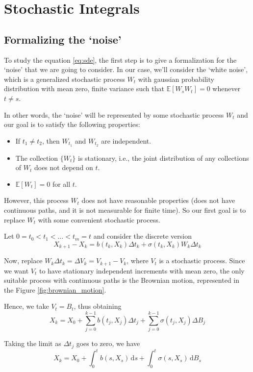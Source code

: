 \documentclass[12pt,a4paper]{article}
\theoremstyle{definition}
\begin{document}
\newpage
\section{Stochastic Integrals}

\subsection{Formalizing the `noise'}

To study the equation \eqref{eq:sde}, the first step is to give a formalization for the `noise' that we are going to consider. In our case, we'll consider the `white noise', which is a generalized stochastic process $W_t$ with gaussian probability distribution with mean zero, finite variance such that $\mathbb{E}[W_sW_t]=0$ whenever $t\neq s$.

In other words, the `noise' will be represented by some stochastic process $W_t$ and our goal is to satisfy the following properties:
\begin{itemize}
	\item If $t_1 \neq t_2$, then $W_{t_1}$ and $W_{t_2}$ are independent.
	\item The collection $\{W_t\}$ is stationary, i.e., the joint distribution of any collections of $W_t$ does not depend on $t$.
	\item $\mathbb{E}[W_t] = 0$ for all $t$.
\end{itemize}

However, this process $W_t$ does not have reasonable properties (does not have continuous paths, and it is not measurable for finite time). So our first goal is to replace $W_t$ with some convenient stochastic process.

Let $0 = t_0 < t_1 < \ldots < t_m = t$ and consider the discrete version
\[
	X_{k+1} - X_k = b(t_k,X_k)\Delta t_k + \sigma(t_k,X_k)W_k \Delta t_k
\]

Now, replace $W_k \Delta t_k = \Delta V_k = V_{k+1} - V_k$, where $V_t$ is a stochastic process. Since we want $V_t$ to have stationary independent increments with mean zero, the only suitable process with continuous paths is the Brownian motion, represented in the Figure \ref{fig:brownian_motion}.

Hence, we take $V_t = B_t$, thus obtaining
\[
	X_k = X_0 + \sum_{j=0}^{k-1} b(t_j, X_j) \Delta t_j + \sum_{j=0}^{k-1} \sigma(t_j, X_j) \Delta B_j
\]

Taking the limit as $\Delta t_j$ goes to zero, we have
\[
	X_k = X_0 + \int_0^t b(s, X_s) \, \mathrm{d}s + \int_0^t \sigma(s, X_s) \, \mathrm{d}B_s
\]
\end{document}
